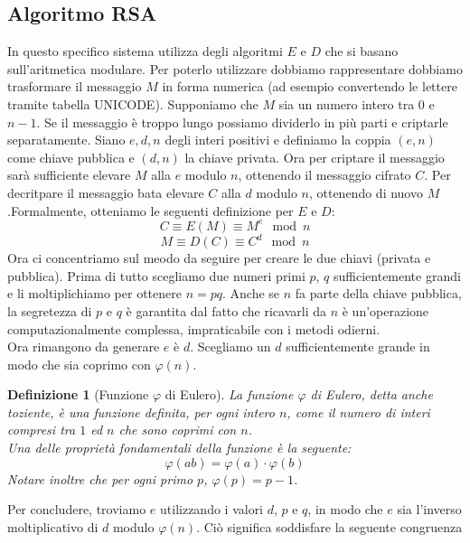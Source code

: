 \documentclass[italian,A4,12pt]{article}
\newtheorem*{defn}{Definizione}
\begin{document}
    \subsection{Algoritmo RSA}
      In questo specifico sistema utilizza degli algoritmi $E$ e $D$ che si basano sull'aritmetica modulare. Per poterlo utilizzare dobbiamo rappresentare dobbiamo trasformare il messaggio $M$ in forma numerica (ad esempio convertendo le lettere tramite tabella UNICODE). Supponiamo che $M$ sia un numero intero tra $0$ e $n-1$. Se il messaggio è troppo lungo possiamo dividerlo in più parti e criptarle separatamente. Siano $e,d,n$ degli interi positivi e definiamo la coppia $(e,n)$ come chiave pubblica e $(d,n)$ la chiave privata.
      Ora per criptare il messaggio sarà sufficiente elevare $M$ alla $e$ modulo $n$, ottenendo il messaggio cifrato $C$. Per decritpare il messaggio bata elevare $C$ alla $d$ modulo $n$, ottenendo di nuovo $M$.Formalmente, otteniamo le seguenti definizione per $E$ e $D$:
      \begin{equation}
        C\equiv E(M) \equiv M^e \mod{n}
     \end{equation}
      $$M \equiv D(C) \equiv C^d \mod{n}$$
      Ora ci concentriamo sul meodo da seguire per creare le due chiavi (privata e pubblica). Prima di tutto scegliamo due numeri primi $p$, $q$ sufficientemente grandi e li moltiplichiamo per ottenere $n=pq$. Anche se $n$ fa parte della chiave pubblica, la segretezza di $p$ e $q$ è garantita dal fatto che ricavarli da $n$ è un'operazione computazionalmente complessa, impraticabile con i metodi odierni.\\
      Ora rimangono da generare $e$ è $d$. Scegliamo un $d$ sufficientemente grande in modo che sia coprimo con $\varphi(n)$.
      \begin{defn}[Funzione $\varphi$ di Eulero]
        La funzione $\varphi$ di Eulero, detta anche toziente, è una funzione definita, per ogni intero $n$, come il numero di interi compresi tra $1$ ed $n$ che sono coprimi con $n$.\\ Una delle proprietà fondamentali della funzione è la seguente:
        \begin{equation}
          \varphi(ab)=\varphi(a)\cdot \varphi(b) \label{phii}
        \end{equation}
        Notare inoltre che per ogni primo $p$, $\varphi(p)=p-1$.
      \end{defn}
      Per concludere, troviamo $e$ utilizzando i valori $d$, $p$ e $q$, in modo che $e$ sia l'inverso moltiplicativo di $d$ modulo $\varphi(n)$. Ciò significa soddisfare la seguente congruenza
\end{document}
